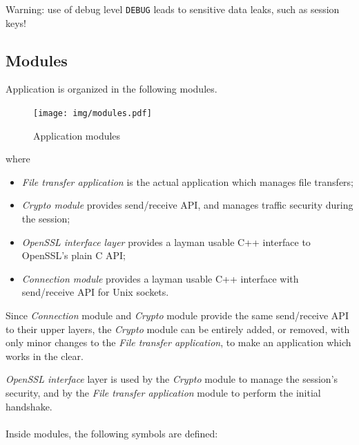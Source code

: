 \documentclass[a4paper,12pt]{article}
\begin{document}
Warning: use of debug level \texttt{DEBUG} leads to sensitive data leaks, such as session keys!

\subsection{Modules}
Application is organized in the following modules.

\begin{figure}[H]
  \centering
  \texttt{[image: img/modules.pdf]}
  \caption{Application modules}
  \label{img:modules}
\end{figure}

where
\begin{itemize}
  \item \emph{File transfer application} is the actual application which manages file transfers;
  \item \emph{Crypto module} provides send/receive API, and manages traffic security during the session;
  \item \emph{OpenSSL interface layer} provides a layman usable C++ interface to OpenSSL's plain C API;
  \item \emph{Connection module} provides a layman usable C++ interface with send/receive API for Unix sockets.
\end{itemize}

Since \emph{Connection} module and \emph{Crypto} module provide the same send/receive API to their upper layers, the \emph{Crypto} module can be entirely added, or removed, with only minor changes to the \emph{File transfer application}, to make an application which works in the clear.

\emph{OpenSSL interface} layer is used by the \emph{Crypto} module to manage the session's security, and by the \emph{File transfer application} module to perform the initial handshake.
\\
\\
Inside modules, the following symbols are defined:
\end{document}
